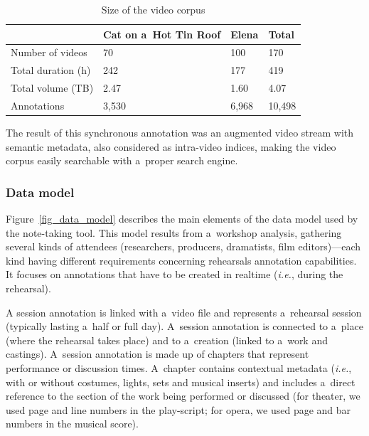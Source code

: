 \documentclass[conference]{IEEEtran}
\newcommand{\todo}[1]{\noindent\textcolor{red}{{\bf \{ToDo} #1{\bf \}}}}
\begin{document}
\begin{table}
\small
\begin{tabular}{|p{2.8cm}|p{1.8cm}|p{1.2cm}|p{1.2cm}|}
\hline 
  & Cat on a~Hot Tin Roof  & Elena & Total \\ 
\hline 
Number of videos & 70 & 100 & 170 \\ 
\hline 
Total duration (h) & 242 & 177 & 419 \\ 
\hline 
Total volume (TB) & 2.47 & 1.60 & 4.07 \\ 
\hline 
Annotations & 3,530 & 6,968 & 10,498\\ 
\hline
\end{tabular} 
\caption{Size of the video corpus}
\label{table_facts}
\end{table}

The result of this synchronous annotation was an augmented  video stream with semantic metadata, also considered as intra-video indices, making the video corpus easily searchable with a~proper search engine.

\subsubsection{Data model} Figure~\ref{fig_data_model} describes the main elements of the data model used by the note-taking tool. This model results from a~workshop analysis, gathering several kinds of attendees (researchers, producers, dramatists, film editors)---each kind having different requirements concerning rehearsals annotation capabilities. It focuses on annotations that have to be created in realtime (\emph{i.e.}, during the rehearsal). \newline

A session annotation is linked with a~video file and represents a~rehearsal session (typically lasting a~half or full day). A~session annotation is connected to a~place (where the rehearsal takes place) and to a~creation (linked to a~work and castings). A~session annotation is made up of chapters that represent performance or discussion times. A~chapter contains contextual metadata (\emph{i.e.}, with or without costumes, lights, sets and musical inserts) and includes a~direct reference to the section of the work being performed or discussed (for theater, we used page and line numbers in the play-script; for opera, we used page and bar numbers in the musical score). 


\end{document}
